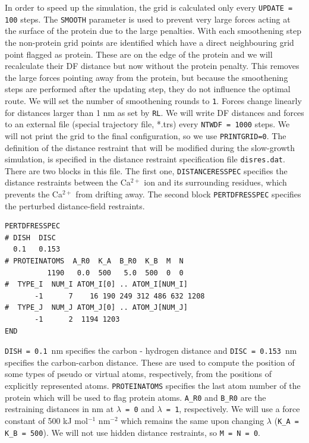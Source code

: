 In order to speed up the simulation, the grid is calculated only every \texttt{UPDATE = 100} steps. 
The \texttt{SMOOTH} parameter is used to prevent very large forces acting at the surface of the protein due to the large penalties. 
With each smoothening step the non-protein grid points are identified which have a direct neighbouring grid point flagged as protein. 
These are on the edge of the protein and we will recalculate their DF distance but now without the protein penalty. 
This removes the large forces pointing away from the protein, but because the smoothening steps are performed after the updating step, they do not influence the optimal route. 
We will set the number of smoothening rounds to \texttt{1}. Forces change linearly for distances larger than 1 nm as set by \texttt{RL}. 
We will write DF distances and forces to an external file (special trajectory file, *.trs) every \texttt{NTWDF = 1000} steps. We will not print the grid to the final configuration, so we use \texttt{PRINTGRID=0}. 
The definition of the distance restraint that will be modified during the slow-growth simulation, is specified in the distance restraint specification file \texttt{disres.dat}. 
There are two blocks in this file. 
The first one, \texttt{DISTANCERESSPEC} specifies the distance restraints between the Ca$^{2+}$ ion and its surrounding residues, which prevents the Ca$^{2+}$ from drifting away. 
The second block \texttt{PERTDFRESSPEC} specifies the perturbed distance-field restraints. 
\begin{lstlisting}
PERTDFRESSPEC
# DISH  DISC
  0.1   0.153
# PROTEINATOMS  A_R0  K_A  B_R0  K_B  M  N
          1190   0.0  500   5.0  500  0  0
#  TYPE_I  NUM_I ATOM_I[0] .. ATOM_I[NUM_I]
       -1      7    16 190 249 312 486 632 1208
#  TYPE_J  NUM_J ATOM_J[0] .. ATOM_J[NUM_J]
       -1      2  1194 1203
END
\end{lstlisting}
\texttt{DISH = 0.1}~nm specifies the carbon - hydrogen distance and \texttt{DISC = 0.153}~nm specifies the carbon-carbon distance. %
These are used to compute the position of some types of pseudo or virtual atoms, respectively, from the positions of explicitly represented atoms.
\texttt{PROTEINATOMS} specifies the last atom number of the protein which will be used to flag protein atoms. 
\texttt{A\_R0} and \texttt{B\_R0} are the restraining distances in nm at \texttt{$\lambda$ = 0} and \texttt{$\lambda$ = 1}, respectively. 
We will use a force constant of 500 kJ mol$^{-1}$ nm$^{-2}$ which remains the same upon changing $\lambda$ (\texttt{K\_A = K\_B = 500}). 
We will not use hidden distance restraints, so \texttt{M = N = 0}. 

